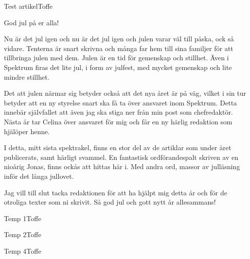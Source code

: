 \documentclass{spektraklet}
\begin{document}
\begin{artikel}{Test artikel}{Toffe}


\begin{twocolumns}
God jul på er alla!



Nu är det jul igen och nu är det jul igen och julen varar väl till påska, ock så vidare. Tenterna är snart skrivna och många far hem till sina familjer för att tillbringa julen med dem. Julen är en tid för gemenskap och stillhet. Även i Spektrum firas det lite jul, i form av julfest, med mycket gemenskap och lite mindre stillhet.


Det att julen närmar sig betyder också att det nya året är på väg, vilket i sin tur betyder att en ny styrelse snart ska få ta över ansvaret inom Spektrum. Detta innebär självfallet att även jag ska stiga ner från min post som chefredaktör. Nästa år tar Celina över ansvaret för mig och får en ny härlig redaktion som hjälöper henne.


I detta, mitt sista spektrakel, finns en stor del av de artiklar som under året publicerats, samt härligt svammel. En fantastisk ordförandespalt skriven av en nioårig Jonas, finns ockås att hittas här i. Med andra ord, massor av julläsning inför det långa jullovet.

Jag vill till slut tacka redaktionen för att ha hjälpt mig detta år och för de otroliga texter som ni skrivit. Så god jul och gott nytt år allesammans!

\end{twocolumns}

\end{artikel}


\begin{artikel}{Temp 1}{Toffe}

\end{artikel}


\begin{artikel}{Temp 2}{Toffe}

\end{artikel}


%


\begin{artikel}{Temp 4}{Toffe}

\end{artikel}
\end{document}

